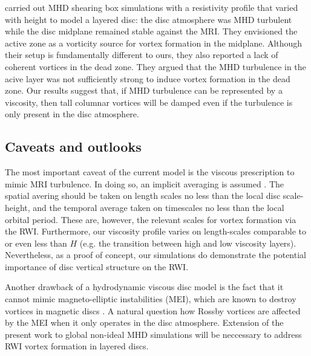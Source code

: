 \cite{oishi09} carried out MHD shearing box simulations with 
a resistivity profile that varied with height to model a
layered disc: the disc atmosphere was MHD turbulent while the disc
midplane remained stable against the MRI. They envisioned the active
zone as a vorticity source for vortex formation in the midplane.  
Although their setup is fundamentally different to ours, they also
reported a lack of coherent vortices in the dead zone. They argued
that the MHD turbulence in the acive layer was not sufficiently strong
to induce vortex formation in the dead zone. Our results suggest that,
if MHD turbulence can be represented by a viscosity, then tall
columnar vortices will be damped even if the turbulence is only
present in the disc atmosphere.    


\subsection{Caveats and outlooks}\label{caveats}

The most important caveat of the current model is the viscous
prescription to mimic MRI turbulence. In doing so, an implicit
averaging is assumed \citep{balbus99}. The spatial avering should be
taken on length scales no less than the local disc scale-height, and
the temporal average taken on timescales no less than the local
orbital period. These are, however, the relevant scales for vortex
formation via the RWI. Furthermore, our viscosity profile varies on
length-scales comparable to or even less than $H$ (e.g. the transition
between high and low viscosity layers). Nevertheless, as a proof of
concept, our simulations do demonstrate the potential importance of
disc vertical structure on the RWI.   

Another drawback of a hydrodynamic viscous disc model is the
fact that it cannot mimic magneto-elliptic instabilities (MEI), which
are known to destroy vortices in magnetic discs
\citep{lyra11,mizerski12}. A natural question how 
Rossby vortices are affected by the MEI when it only operates in
the disc atmosphere. Extension of the present work to global non-ideal
MHD simulations will be neccessary to address RWI vortex formation in
layered discs.   


